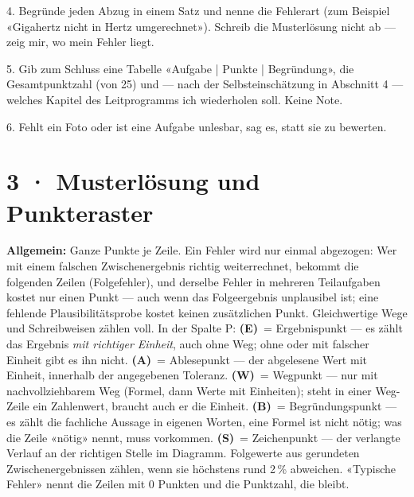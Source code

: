 \documentclass[11pt]{article}
\begin{document}
\begin{tcolorbox}[breakable,colback=lplinie!25,colframe=lplinie,boxrule=0.5pt,arc=1mm,fontupper=\small]
4. Begründe jeden Abzug in einem Satz und nenne die Fehlerart (zum Beispiel «Gigahertz nicht in Hertz umgerechnet»). Schreib die Musterlösung nicht ab — zeig mir, wo mein Fehler liegt.\par
5. Gib zum Schluss eine Tabelle «Aufgabe | Punkte | Begründung», die Gesamtpunktzahl (von 25) und — nach der Selbsteinschätzung in Abschnitt 4 — welches Kapitel des Leitprogramms ich wiederholen soll. Keine Note.\par
6. Fehlt ein Foto oder ist eine Aufgabe unlesbar, sag es, statt sie zu bewerten.
\end{tcolorbox}

\section*{3 · Musterlösung und Punkteraster}
\textbf{Allgemein:} Ganze Punkte je Zeile. Ein Fehler wird nur einmal abgezogen: Wer mit einem falschen Zwischenergebnis
richtig weiterrechnet, bekommt die folgenden Zeilen (Folgefehler), und derselbe Fehler in mehreren Teilaufgaben kostet nur einen Punkt — auch wenn das Folgeergebnis unplausibel ist; eine fehlende
Plausibilitätsprobe kostet keinen zusätzlichen Punkt. Gleichwertige Wege und Schreibweisen zählen voll.
In der Spalte P: \textbf{(E)}~= Ergebnispunkt — es zählt das Ergebnis \emph{mit richtiger Einheit}, auch ohne Weg; ohne oder mit
falscher Einheit gibt es ihn nicht. \textbf{(A)}~= Ablesepunkt — der abgelesene Wert mit Einheit, innerhalb der angegebenen Toleranz. \textbf{(W)}~= Wegpunkt — nur mit nachvollziehbarem Weg (Formel, dann Werte mit Einheiten);
steht in einer Weg-Zeile ein Zahlenwert, braucht auch er die Einheit. \textbf{(B)}~= Begründungspunkt — es zählt die fachliche
Aussage in eigenen Worten, eine Formel ist nicht nötig; was die Zeile «nötig» nennt, muss vorkommen. \textbf{(S)}~= Zeichenpunkt — der verlangte Verlauf an der richtigen Stelle im Diagramm.
Folgewerte aus gerundeten Zwischenergebnissen zählen, wenn sie höchstens rund 2\,\% abweichen.
«Typische Fehler» nennt die Zeilen mit 0 Punkten und die Punktzahl, die bleibt.
\end{document}
